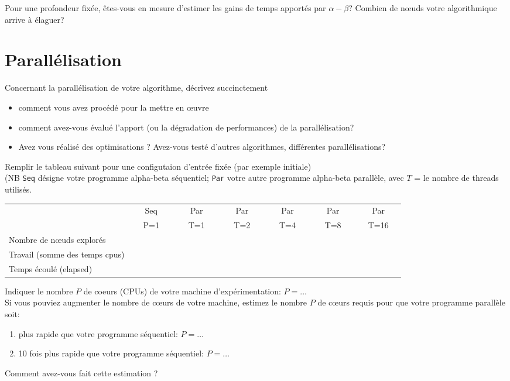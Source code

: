 \documentclass[a4paper, 11pt]{article}
\begin{document}
\vspace{.5cm}
Pour une profondeur fixée, êtes-vous en mesure d'estimer les gains de temps
apportés par $\alpha-\beta$? Combien de n\oe uds votre algorithmique arrive
à élaguer?

\vspace{2cm}

\section{Parallélisation}

Concernant la parallélisation de votre algorithme,
décrivez succinctement 
\begin{itemize}
\item comment vous avez procédé pour la mettre en œuvre
\item comment avez-vous évalué l'apport (ou la dégradation de
  performances) de la parallélisation?
\item Avez vous réalisé des optimisations ? Avez-vous testé d'autres
  algorithmes, différentes parallélisations?
\end{itemize}

Remplir le tableau suivant pour une  configutaion d'entrée fixée (par exemple initiale)  \\
(NB {\tt Seq} désigne votre programme alpha-beta séquentiel; {\tt Par} votre autre programme alpha-beta parallèle,
avec $T$ = le nombre de threads utilisés. 

\begin{center}
\begin{tabular}{|l||c|c|c|c|c|c||}
\hline
                          & ~~~Seq~~~ & ~~~Par~~~ & ~~~Par~~~ & ~~~Par~~~ & ~~~Par~~~ & ~~~Par~~~   \\
                          & P=1 & T=1  & T=2 & T=4 & T=8 & T=16  \\
\hline
Nombre de n{\oe}uds explorés      & & & & & &  \\
\hline
Travail (somme des temps cpus) & & & & & &  \\
\hline
Temps écoulé (elapsed)         & & & & & & \\
\hline
\end{tabular} 
\end{center}
Indiquer le nombre $P$  de coeurs (CPUs) de votre machine d'expérimentation: $P = \ldots$ \\
Si vous pouviez augmenter le nombre de c{\oe}urs de votre machine, estimez le nombre $P$ de  c{\oe}urs requis pour que votre programme parallèle soit:
\begin{enumerate}
\item plus rapide que votre programme séquentiel: $P=\ldots $
\item 10 fois plus rapide que votre programme séquentiel: $P=\ldots $
\end{enumerate}
Comment avez-vous fait cette estimation ? %
\end{document}
